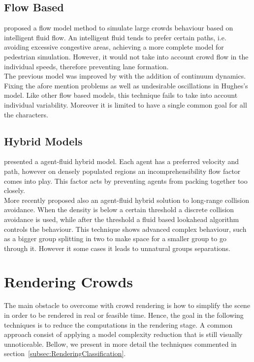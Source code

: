 \documentclass[6pt]{article} %
\begin{document}
\begin{multicols}{2}
\subsection{Flow Based}

\cite{hughes2003} proposed a flow model method to simulate large crowds behaviour based on intelligent fluid flow.
An intelligent fluid tends to prefer certain paths, i.e. avoiding excessive congestive areas, achieving a more complete model for pedestrian simulation.
However, it would not take into account crowd flow in the individual speeds, therefore preventing lane formation.\\

The previous model was improved by \cite{treuille2006} with the addition of continuum dynamics.
Fixing the afore mention problems as well as undesirable oscillations in Hughes's model.
Like other flow based models, this technique fails to take into account individual variability.
Moreover it is limited to have a single common goal for all the characters.

\subsection{Hybrid Models}

\cite{Narain2009} presented a agent-fluid hybrid model.
Each agent has a preferred velocity and path, however on densely populated regions an incomprehensibility flow factor comes into play.
This factor acts by preventing agents from packing together too closely.\\

More recently \cite{lin2014} proposed also an agent-fluid hybrid solution to long-range collision avoidance.
When the density is below a certain threshold a discrete collision avoidance is used,
while after the threshold a fluid based lookahead algorithm controls the behaviour.
This technique shows advanced complex behaviour, such as a bigger group splitting in two to make space for a smaller group to go through it.
However it some cases it leads to unnatural groups separations.

\section{Rendering Crowds}

The main obstacle to overcome with crowd rendering is how to simplify the scene in order to be rendered in real or feasible time.
Hence, the goal in the following techniques is to reduce the computations in the rendering stage.
A common approach consist of applying a model complexity reduction that is still visually unnoticeable.
Bellow, we present in more detail the techniques commented in section~\ref{subsec:RenderingClassification}.


\end{multicols}
\end{document}
